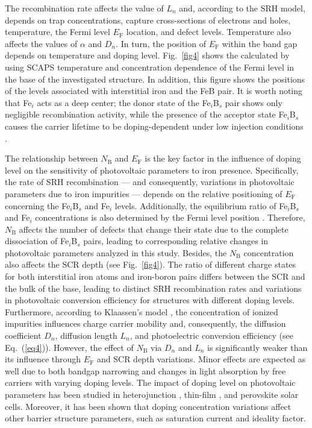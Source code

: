 \documentclass[a4paper,fleqn]{cas-sc}
\begin{document}
The recombination rate affects the value of $L_n$ and, according to the SRH model,
depends on trap concentrations, capture cross-sections of electrons and holes, temperature, the Fermi level $E_\mathrm{F}$ location, and defect levels.
Temperature also affects the values of $\alpha$ and $D_n$.
In turn, the position of $E_\mathrm{F}$ within the band gap depends on temperature and doping level.
Fig.~\ref{fig4} shows the calculated by using SCAPS temperature and concentration dependence of the Fermi level in the base of the investigated structure.
In addition, this figure shows the positions of the levels associated with interstitial iron and the FeB pair.
It is worth noting that Fe$_i$ acts as a deep center;
the donor state of the Fe$_i$B$_s$ pair shows only negligible recombination activity,
while the presence of the acceptor state Fe$_i$B$_s$ causes the
carrier lifetime to be doping-dependent under low injection conditions \cite{FeB:Schmidt}.


The relationship between $N_\mathrm{B}$ and $E_\mathrm{F}$ is the key  factor
in the influence of doping level on the sensitivity of photovoltaic parameters to iron presence.
Specifically, the rate of SRH recombination ---
and consequently, variations in photovoltaic parameters due to iron impurities ---
depends on the relative positioning of $E_\mathrm{F}$ concerning the Fe$_i$B$_s$ and Fe$_i$ levels.
Additionally, the equilibrium ratio of Fe$_i$B$_s$ and Fe$_i$ concentrations is also determined by the Fermi level position \cite{FeB:kinetic,MurphyJAP2011}.
Therefore, $N_\mathrm{B}$ affects the number of defects that change their state due to the complete dissociation of Fe$_i$B$_s$ pairs,
leading to corresponding relative changes in photovoltaic parameters analyzed in this study.
Besides, the $N_\mathrm{B}$ concentration also affects the SCR depth (see Fig.~\ref{fig4}).
The ratio of different charge states for both interstitial iron atoms and iron-boron pairs differs between the SCR and the bulk of the base, leading to distinct SRH recombination rates and variations in photovoltaic conversion efficiency for structures with different doping levels.
Furthermore, according to Klaassen’s model \cite{KLAASSEN953},
the concentration of ionized impurities influences charge carrier mobility and, consequently, the diffusion coefficient $D_n$, diffusion length $L_n$,
and photoelectric conversion efficiency (see Eq.~(\ref{eq4})).
However, the effect of $N_\mathrm{B}$ via $D_n$ and $L_n$ is significantly weaker than its influence through $E_\mathrm{F}$ and SCR depth variations.
Minor effects are expected as well due to both bandgap narrowing and changes in light absorption by free carriers with varying doping levels.
The impact of doping level on photovoltaic parameters has been studied in heterojunction \cite{Sultana2024},
thin-film \cite{Akila2024},
and perovskite \cite{MasumMia2025} solar cells.
Moreover, it has been shown \cite{Akila2024} that
doping concentration variations affect other barrier structure parameters, such as saturation current and ideality factor.
\end{document}
